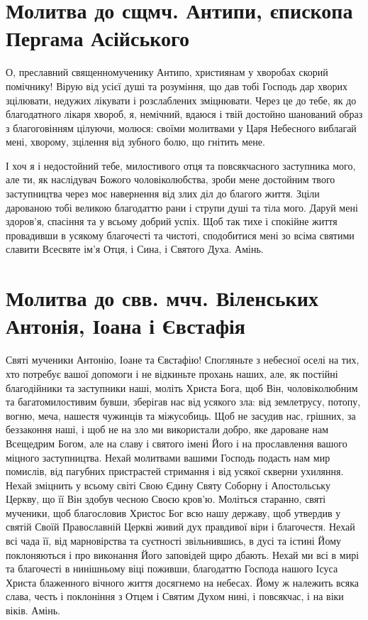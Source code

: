 \documentclass[chapters.tex]{subfiles}
\begin{document}
\section{Молитва до сщмч. Антипи, єпископа Пергама Асійського}
О, преславний священномученику Антипо, християнам у хворобах скорий помічнику! Вірую від усієї душі та розуміння, що дав тобі Господь дар хворих зцілювати, недужих лікувати і розслаблених зміцнювати. Через це до тебе, як до благодатного лікаря хвороб, я, немічний, вдаюся і твій достойно шанований образ з благоговінням цілуючи, молюся: своїми молитвами у Царя Небесного виблагай мені, хворому, зцілення від зубного болю, що гнітить мене.

І хоч я і недостойний тебе, милостивого отця та повсякчасного заступника мого, але ти, як наслідувач Божого чоловіколюбства, зроби мене достойним твого заступництва через моє навернення від злих діл до благого життя. Зціли дарованою тобі великою благодаттю рани і струпи душі та тіла мого. Даруй мені здоров’я, спасіння та у всьому добрий успіх. Щоб так тихе і спокійне життя провадивши в усякому благочесті та чистоті, сподобитися мені зо всіма святими славити Всесвяте ім’я Отця, і Сина, і Святого Духа. Амінь.

\section{Молитва до свв. мчч. Віленських Антонія, Іоана і Євстафія}
Святі мученики Антонію, Іоане та Євстафію! Спогляньте з небесної оселі на тих, хто потребує вашої допомоги і не відкиньте прохань наших, але, як постійні благодійники та заступники наші, моліть Христа Бога, щоб Він, чоловіколюбним та багатомилостивим бувши, зберігав нас від усякого зла: від землетрусу, потопу, вогню, меча, нашестя чужинців та міжусобиць. Щоб не засудив нас, грішних, за беззаконня наші, і щоб не на зло ми використали добро, яке дароване нам Всещедрим Богом, але на славу і святого імені Його і на прославлення вашого міцного заступництва. Нехай молитвами вашими Господь подасть нам мир помислів, від пагубних пристрастей стримання і від усякої скверни ухиляння. Нехай зміцнить у всьому світі Свою Єдину Святу Соборну і Апостольську Церкву, що її Він здобув чесною Своєю кров’ю. Моліться старанно, святі мученики, щоб благословив Христос Бог всю нашу державу, щоб утвердив у святій Своїй Православній Церкві живий дух правдивої віри і благочестя. Нехай всі чада її, від марновірства та суєтності звільнившись, в дусі та істині Йому поклоняються і про виконання Його заповідей щиро дбають. Нехай ми всі в мирі та благочесті в нинішньому віці поживши, благодаттю Господа нашого Ісуса Христа блаженного вічного життя досягнемо на небесах. Йому ж належить всяка слава, честь і поклоніння з Отцем і Святим Духом нині, і повсякчас, і на віки віків. Амінь.
\end{document}
